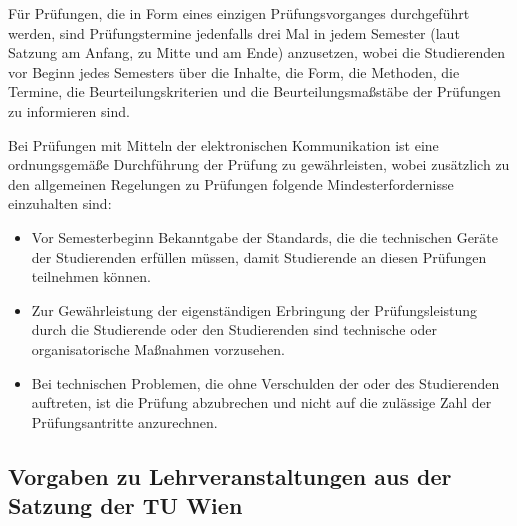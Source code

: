 Für Prüfungen, die in Form eines einzigen Prüfungsvorganges
durchgeführt werden, sind Prüfungstermine jedenfalls drei Mal in jedem
Semester (laut Satzung am Anfang, zu Mitte und am Ende) anzusetzen,
wobei die Studierenden vor Beginn jedes Semesters über die Inhalte,
die Form, die Methoden, die Termine, die Beurteilungskriterien und die
Beurteilungsmaßstäbe der Prüfungen zu informieren sind.

Bei Prüfungen mit Mitteln der elektronischen Kommunikation ist eine
ordnungsgemäße Durchführung der Prüfung zu gewährleisten, wobei
zusätzlich zu den allgemeinen Regelungen zu Prüfungen folgende
Mindesterfordernisse einzuhalten sind:
\begin{itemize}
\item Vor Semesterbeginn Bekanntgabe der Standards, die die
  technischen Geräte der Studierenden erfüllen müssen, damit
  Studierende an diesen Prüfungen teilnehmen können.
\item Zur Gewährleistung der eigenständigen Erbringung der
  Prüfungsleistung durch die Studierende oder den Studierenden sind
  technische oder organisatorische Maßnahmen vorzusehen.
\item Bei technischen Problemen, die ohne Verschulden der oder des
  Studierenden auftreten, ist die Prüfung abzubrechen und nicht auf
  die zulässige Zahl der Prüfungsantritte anzurechnen.
\end{itemize}

\subsection*{Vorgaben zu Lehrveranstaltungen aus der Satzung der TU
  Wien}

